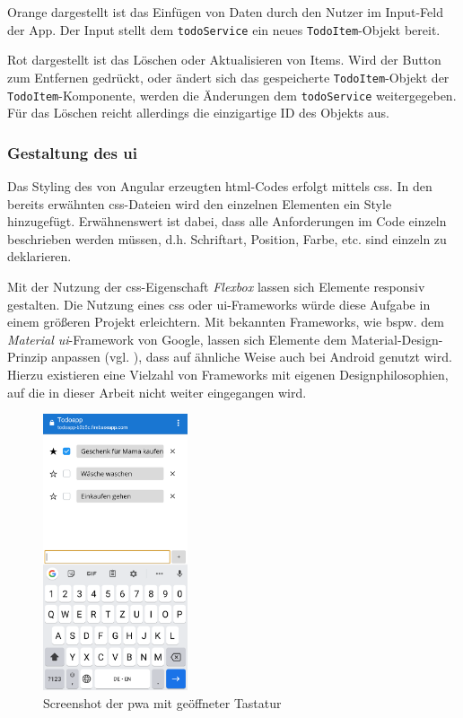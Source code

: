 Orange dargestellt ist das Einfügen von Daten durch den Nutzer im Input-Feld der App. Der Input stellt dem \texttt{todoService} ein neues \texttt{TodoItem}-Objekt bereit.

Rot dargestellt ist das Löschen oder Aktualisieren von Items. Wird der Button zum Entfernen gedrückt, oder ändert sich das gespeicherte \texttt{TodoItem}-Objekt der \texttt{TodoItem}-Komponente, werden die Änderungen dem \texttt{todoService} weitergegeben.
Für das Löschen reicht allerdings die einzigartige ID des Objekts aus.

\subsubsection{Gestaltung des \acl{ui}}
Das Styling des von Angular erzeugten \ac{html}-Codes erfolgt mittels \ac{css}. In den bereits erwähnten \ac{css}-Dateien wird den einzelnen Elementen ein Style hinzugefügt.
Erwähnenswert ist dabei, dass alle Anforderungen im Code einzeln beschrieben werden müssen, d.h. Schriftart, Position, Farbe, etc. sind einzeln zu deklarieren.

Mit der Nutzung der \ac{css}-Eigenschaft \textit{Flexbox} lassen sich Elemente responsiv gestalten. Die Nutzung eines \ac{css} oder \ac{ui}-Frameworks würde diese Aufgabe in einem größeren Projekt erleichtern. Mit bekannten Frameworks, wie bspw. dem \textit{Material \ac{ui}}-Framework von Google, lassen sich Elemente dem Material-Design-Prinzip anpassen (vgl. \cite{MaterialUI}), dass auf ähnliche Weise auch bei Android genutzt wird. Hierzu existieren eine Vielzahl von Frameworks mit eigenen Designphilosophien, auf die in dieser Arbeit nicht weiter eingegangen wird.

\begin{figure}[h!]
	\centering
	\includegraphics[width=0.38\textwidth]{img/pwa_screenshot_mit_tastatur.png}
	\caption{Screenshot der \ac{pwa} mit geöffneter Tastatur}
	\label{fig:pwa_mit_tastatur}
\end{figure}

